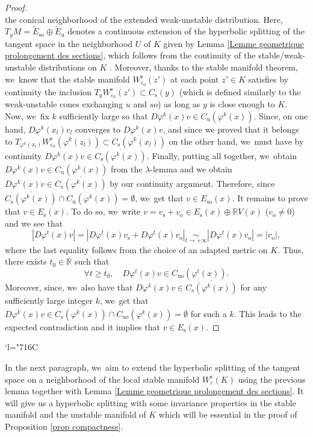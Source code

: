\documentclass[JEP,XML,SOM,Unicode,NoEqCountersInSection,NoFloatCountersInSection,published]{cedram}
\newcommand{\Changelback}{\mathcode`l="716C}
\newcommand{\ro}{\mathrm{o}}
\newcommand{\rs}{\mathrm{s}}
\newcommand{\rso}{\mathrm{so}}
\newcommand{\ru}{\mathrm{u}}
\newcommand{\ruo}{\mathrm{uo}}
\theoremstyle{definition}
\theoremstyle{plain}
\newcommand{\R}{\mathbb{R}}
\begin{document}
\begin{proof}
\[\]
the conical neighborhood of the extended weak-unstable distribution. Here, $T_y M = \widetilde{E}_{\rso} \oplus \widetilde{E}_{\ru}$ denotes a continuous extension of the hyperbolic splitting of the tangent space in the neighborhood $U$ of $K$ given by Lemma \ref{Lemme geometrique prolongement des sections}, which follows from the continuity of the stable/weak-unstable distributions on $K$ \cite[Prop.\,5.1.4]{FH}. Moreover, thanks to the stable manifold theorem, we~know that the stable manifold $W_{\varepsilon_0}^\rs (z')$ at each point \hbox{$z' \in K$} satisfies by continuity the inclusion $ T_y W_{\varepsilon_0}^{\rs} (z') \subset C_{\rs} (y)$ (which is defined similarly to the weak-unstable cones exchanging $u$ and $so$) as long as $y$ is close enough to $K$. Now, we~fix $k$ sufficiently large so that $D \varphi^k (x)v \in C_{\ru} (\varphi^k (x))$. Since, on one hand, $D \varphi^k (x_l)v_l$ converges to $D \varphi^k (x)v$, and since we proved that it belongs to $ T_{\varphi^k (x_l)} W_{\varepsilon_0}^{\rs} (\varphi^k (z_l)) \subset C_{\rs} (\varphi^k (x_l))$ on the other hand, we~must have by continuity $ D \varphi^k (x)v \in \overline{C_{\rs} (\varphi^k (x))}.$
Finally, putting all together, we~obtain $D \varphi^k (x)v \in C_{\ru} (\varphi^k (x))$ from the $\lambda$-lemma and we obtain $ D \varphi^k (x)v \in \overline{C_{\rs} (\varphi^k (x))}$ by our continuity argument. Therefore, since $\overline{C_{\rs} (\varphi^k (x))} \cap C_{\ru} (\varphi^k (x)) = \emptyset$, we~get that $v \in E_{\rso} (x)$. It remains to prove that $v \in E_\rs (x)$. To do so, we~write $v = v_\rs + v_\ro \in E_\rs (x) \oplus \R V(x)$ ($v_\ro \neq 0$) and we see that
\[
|D\varphi^t (x) v| = |D\varphi^t (x) v_\rs + D\varphi^t (x) v_\ro| \underset{t \to +\infty}{\sim} |D\varphi^t (x) v_\ro | = |v_\ro|,
\]
where the last equality follows from the choice of an adapted metric on $K$. Thus, there exists $t_0 \in \R$ such that
\[
\forall t \geq t_0, \quad D\varphi^t (x) v \in C_{\ruo}(\varphi^t (x)).
\]
Moreover, since, we~also have that $ D \varphi^k (x)v \in \overline{C_{\rs} (\varphi^k (x))}$ for any sufficiently large integer $k$, we~get that $D \varphi^k (x)v \in \overline{C_{\rs} (\varphi^k (x))} \cap C_{\ruo}(\varphi^k (x)) = \emptyset$ for such a $k$. This leads to the expected contradiction and it implies that $v \in E_\rs (x)$.
\end{proof}
\Changelback%

In the next paragraph, we~aim to extend the hyperbolic splitting of the tangent space on a neighborhood of the local stable manifold $W_{\varepsilon}^\rs (K)$ using the previous lemma together with Lemma \ref{Lemme geometrique prolongement des sections}. It will give us a hyperbolic splitting with some invariance properties in the stable manifold and the unstable manifold of $K$ which will be essential in the proof of Proposition \ref{prop compactness}.
\end{document}

